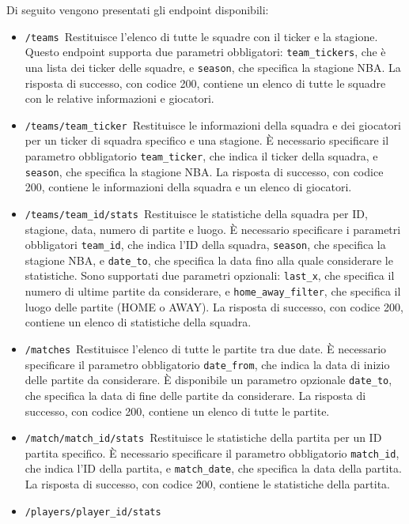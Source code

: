 Di seguito vengono presentati gli endpoint disponibili:
\begin{itemize}
    \item \texttt{/teams}\
    Restituisce l'elenco di tutte le squadre con il ticker e la stagione. Questo endpoint supporta due parametri obbligatori: \texttt{team\_tickers}, che è una lista dei ticker delle squadre, e \texttt{season}, che specifica la stagione NBA. La risposta di successo, con codice 200, contiene un elenco di tutte le squadre con le relative informazioni e giocatori.
    \item \texttt{/teams/{team\_ticker}}\
    Restituisce le informazioni della squadra e dei giocatori per un ticker di squadra specifico e una stagione. È necessario specificare il parametro obbligatorio \texttt{team\_ticker}, che indica il ticker della squadra, e \texttt{season}, che specifica la stagione NBA. La risposta di successo, con codice 200, contiene le informazioni della squadra e un elenco di giocatori.
    \item \texttt{/teams/{team\_id}/stats}\
    Restituisce le statistiche della squadra per ID, stagione, data, numero di partite e luogo. È necessario specificare i parametri obbligatori \texttt{team\_id}, che indica l'ID della squadra, \texttt{season}, che specifica la stagione NBA, e \texttt{date\_to}, che specifica la data fino alla quale considerare le statistiche. Sono supportati due parametri opzionali: \texttt{last\_x}, che specifica il numero di ultime partite da considerare, e \texttt{home\_away\_filter}, che specifica il luogo delle partite (HOME o AWAY). La risposta di successo, con codice 200, contiene un elenco di statistiche della squadra.
    \item \texttt{/matches}\
    Restituisce l'elenco di tutte le partite tra due date. È necessario specificare il parametro obbligatorio \texttt{date\_from}, che indica la data di inizio delle partite da considerare. È disponibile un parametro opzionale \texttt{date\_to}, che specifica la data di fine delle partite da considerare. La risposta di successo, con codice 200, contiene un elenco di tutte le partite.
    \item \texttt{/match/{match\_id}/stats}\
    Restituisce le statistiche della partita per un ID partita specifico. È necessario specificare il parametro obbligatorio \texttt{match\_id}, che indica l'ID della partita, e \texttt{match\_date}, che specifica la data della partita. La risposta di successo, con codice 200, contiene le statistiche della partita.
    \item \texttt{/players/{player\_id}/stats}\

\end{itemize}
